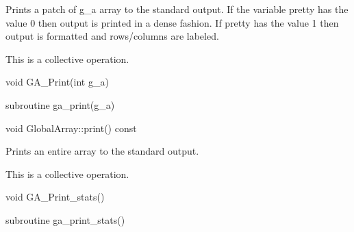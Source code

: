 \documentclass[12pt]{article}
\begin{document}
\begin{desc}

Prints a patch of g_a array to the standard output. If the variable 
pretty has the value 0 then output is printed in a dense fashion. If 
pretty has the value 1 then output is formatted and rows/columns are labeled.

This is a collective operation.
\end{desc}


\begin{capi}
\begin{ccode}
void GA_Print(int g_a)
\end{ccode}
\begin{funcargs}
\end{funcargs}
\end{capi}

\begin{fapi}
\begin{fcode}
subroutine ga_print(g_a)   
\end{fcode}
\begin{funcargs}
\end{funcargs}
\end{fapi}

\begin{cxxapi}
\begin{cxxcode}
void GlobalArray::print() const
\end{cxxcode}
\end{cxxapi}



\begin{desc}

Prints an entire array to the standard output.

This is a collective operation.
\end{desc}


\begin{capi}
\begin{ccode}
void GA_Print_stats()
\end{ccode}
\end{capi}

\begin{fapi}
\begin{fcode}
subroutine ga_print_stats()
\end{fcode}
\end{fapi}
\end{document}
